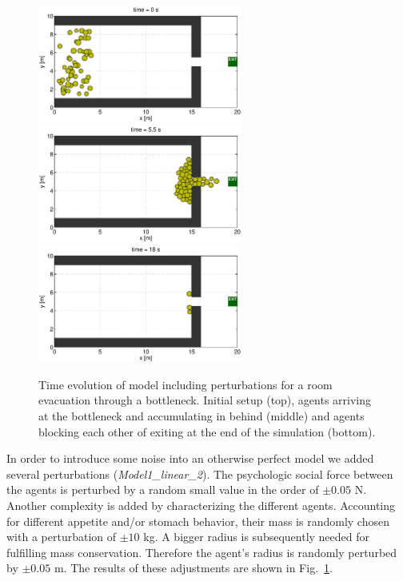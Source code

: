 \documentclass[11pt]{article}
\begin{document}
\begin{figure}
	\begin{center}
	\includegraphics[width=0.6\textwidth]
	{figures/Model1_direct_2b_000000.eps}
	\qquad
	\includegraphics[width=0.6\textwidth]
	{figures/Model1_direct_2b_000550.eps}
	\qquad
	\includegraphics[width=0.6\textwidth]
	{figures/Model1_direct_2b_001800.eps}
	\caption{Time evolution of model including perturbations for a room evacuation through a bottleneck. Initial setup (top), agents arriving at the bottleneck and accumulating in behind (middle) and agents blocking each other of exiting at the end of the simulation (bottom).}
	\label{fig:simple2}
	\end{center}
\end{figure}

In order to introduce some noise into an otherwise perfect model we added several perturbations ({\it Model1\_linear\_2}). The psychologic social force between the agents is perturbed by a random small value in the order of $\pm 0.05$ N. Another complexity is added by characterizing the different agents. Accounting for different appetite and/or stomach behavior, their mass is randomly chosen with a perturbation of $\pm 10$ kg. A bigger radius is subsequently needed for fulfilling mass conservation. Therefore the agent's radius is randomly perturbed by $\pm 0.05$ m. The results of these adjustments are shown in Fig.~\ref{fig:simple2}.
\end{document}
